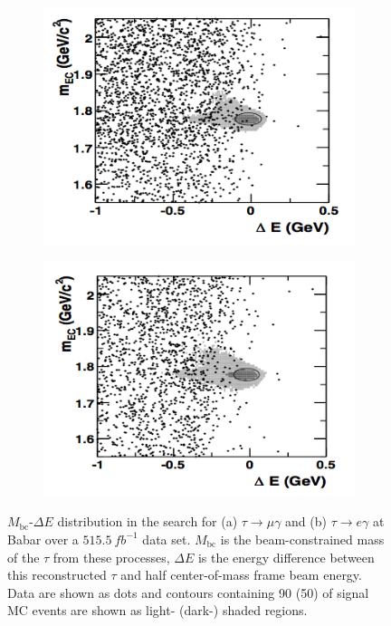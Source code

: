 \documentclass[12pt]{thesis}  %
\begin{document}
   \begin{figure}[h]
        \centering
        \begin{subfigure}[b]{0.475\textwidth}
            \centering
            \includegraphics[width=\textwidth]{images/babar-search-tauMG-signal-region.png}
            \caption[Network2]%
            {{\small}}    
        \end{subfigure}
        \hfill
        \begin{subfigure}[b]{0.475\textwidth}  
            \centering 
            \includegraphics[width=\textwidth]{images/babar-search-tauEG-signal-region.png}
            \caption[]%
            {{\small}}    
        \end{subfigure}
        \caption{$M_{\text{bc}}$-$\Delta E$ distribution in the search for (a) $\tau\to\mu\gamma$ and (b) $\tau\to e\gamma$ at Babar over a $\SI{515.5}{fb^{-1}}$ data set. $M_{\text{bc}}$ is the beam-constrained mass of the $\tau$ from these processes, $\Delta E$ is the energy difference between this reconstructed $\tau$ and half center-of-mass frame beam energy. Data are shown as dots and contours containing \num{90}{\percent} (\num{50}{\percent}) of signal MC events are shown as light- (dark-) shaded regions.}
        \label{fig:babar signal region}
    \end{figure}
\end{document}
